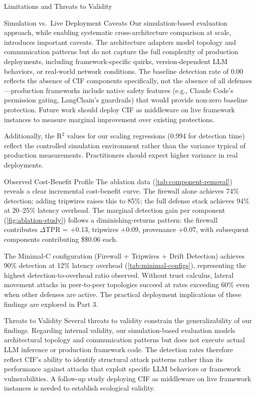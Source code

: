 \documentclass[
  ignorenonframetext,
]{beamer}
\begin{document}
\begin{frame}{Limitations and Threats to Validity}
\begin{block}{Simulation vs.~Live Deployment Caveats}
\protect{}\label{simulation-vs.-live-deployment-caveats}
Our simulation-based evaluation approach, while enabling systematic
cross-architecture comparison at scale, introduces important caveats.
The architecture adapters model topology and communication patterns but
do not capture the full complexity of production deployments, including
framework-specific quirks, version-dependent LLM behaviors, or
real-world network conditions. The baseline detection rate of 0.00
reflects the absence of CIF components specifically, not the absence of
all defenses---production frameworks include native safety features
(e.g., Claude Code's permission gating, LangChain's guardrails) that
would provide non-zero baseline protection. Future work should deploy
CIF as middleware on live framework instances to measure marginal
improvement over existing protections.

Additionally, the R\(^2\) values for our scaling regressions (0.994 for
detection time) reflect the controlled simulation environment rather
than the variance typical of production measurements. Practitioners
should expect higher variance in real deployments.
\end{block}

\begin{block}{Observed Cost-Benefit Profile}
\protect{}\label{observed-cost-benefit-profile}
The ablation data (\cref{tab:component-removal}) reveals a clear
incremental cost-benefit curve. The firewall alone achieves 74\%
detection; adding tripwires raises this to 85\%; the full defense stack
achieves 94\% at 20--25\% latency overhead. The marginal detection gain
per component (\cref{fig:ablation-study}) follows a diminishing-returns
pattern: the firewall contributes \(\Delta\)TPR = +0.13, tripwires
+0.09, provenance +0.07, with subsequent components contributing
\$\leq\$0.06 each.

The Minimal-C configuration (Firewall + Tripwires + Drift Detection)
achieves 90\% detection at 12\% latency overhead
(\cref{tab:minimal-configs}), representing the highest
detection-to-overhead ratio observed. Without trust calculus, lateral
movement attacks in peer-to-peer topologies succeed at rates exceeding
60\% even when other defenses are active. The practical deployment
implications of these findings are explored in Part 3.
\end{block}

\begin{block}{Threats to Validity}
\protect{}\label{threats-to-validity}
Several threats to validity constrain the generalizability of our
findings. Regarding internal validity, our simulation-based evaluation
models architectural topology and communication patterns but does not
execute actual LLM inference or production framework code. The detection
rates therefore reflect CIF's ability to identify structural attack
patterns rather than its performance against attacks that exploit
specific LLM behaviors or framework vulnerabilities. A follow-up study
deploying CIF as middleware on live framework instances is needed to
establish ecological validity.


\end{block}
\end{frame}
\end{document}
